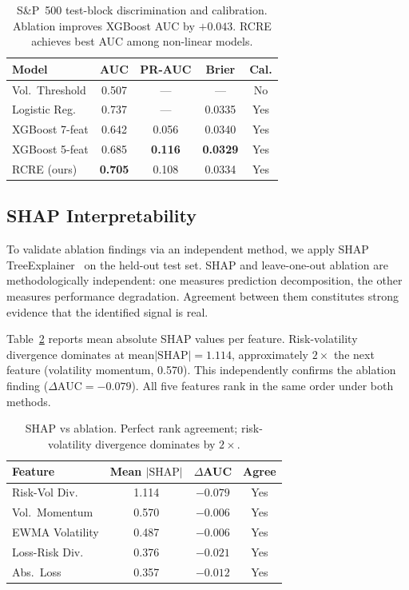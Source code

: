 \documentclass[sigconf, anonymous]{acmart}
\begin{document}
\begin{table}[t]
\caption{S\&P~500 test-block discrimination and calibration. Ablation improves XGBoost AUC by $+0.043$. RCRE achieves best AUC among non-linear models.}
\label{tab:disc}
\begin{tabular}{lcccc}
\toprule
Model & AUC & PR-AUC & Brier & Cal. \\
\midrule
Vol.\ Threshold   & 0.507 & ---   & ---    & No  \\
Logistic Reg.\    & 0.737 & ---   & 0.0335 & Yes \\
XGBoost 7-feat    & 0.642 & 0.056 & 0.0340 & Yes \\
XGBoost 5-feat    & 0.685 & \textbf{0.116} & \textbf{0.0329} & Yes \\
RCRE (ours)       & \textbf{0.705} & 0.108 & 0.0334 & Yes \\
\bottomrule
\end{tabular}
\end{table}

\subsection{SHAP Interpretability}

To validate ablation findings via an independent method, we apply SHAP TreeExplainer~\cite{lundberg2017unified} on the held-out test set. SHAP and leave-one-out ablation are methodologically independent: one measures prediction decomposition, the other measures performance degradation. Agreement between them constitutes strong evidence that the identified signal is real.

Table~\ref{tab:shap} reports mean absolute SHAP values per feature. Risk-volatility divergence dominates at mean$|\text{SHAP}|{=}1.114$, approximately $2\times$ the next feature (volatility momentum, 0.570). This independently confirms the ablation finding ($\Delta\text{AUC} = -0.079$). All five features rank in the same order under both methods.

\begin{table}[t]
\caption{SHAP vs ablation. Perfect rank agreement; risk-volatility
divergence dominates by $2\times$.}
\label{tab:shap}
\small
\begin{tabular}{lccc}
\toprule
\textbf{Feature} & \textbf{Mean $|\text{SHAP}|$} & \textbf{$\Delta$AUC} & \textbf{Agree} \\
\midrule
Risk-Vol Div.            & 1.114 & $-0.079$ & Yes \\
Vol.\ Momentum           & 0.570 & $-0.006$ & Yes \\
EWMA Volatility          & 0.487 & $-0.006$ & Yes \\
Loss-Risk Div.           & 0.376 & $-0.021$ & Yes \\
Abs.\ Loss               & 0.357 & $-0.012$ & Yes \\
\bottomrule
\end{tabular}
\end{table}
\end{document}
